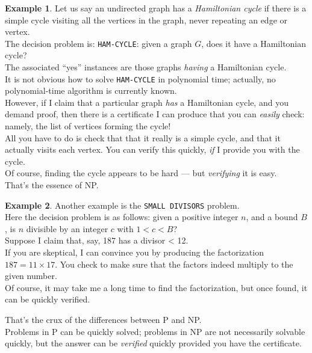 \documentclass[12pt]{article}
\theoremstyle{plain}
\theoremstyle{definition}
\newtheorem*{ex*}{Example}
\begin{document}
\begin{ex*}
Let us say an undirected graph has a \emph{Hamiltonian cycle} if there is a simple cycle visiting all the vertices in the graph, never repeating an edge or vertex. \\
The decision problem is:
\texttt{HAM-CYCLE}: given a graph $G$, does it have a Hamiltonian cycle? \\

The associated ``yes'' instances are those graphs \emph{having} a Hamiltonian cycle. \\
It is not obvious how to solve \texttt{HAM-CYCLE} in polynomial time;
actually, no polynomial-time algorithm is currently known. \\
However, if I claim that a particular graph \emph{has} a Hamiltonian cycle, and you demand proof, then there is a certificate I can produce that you can \emph{easily} check: namely, the list of vertices forming the cycle! \\
All you have to do is check that that it really is a simple cycle, and that it actually visits each vertex.
You can verify this quickly, \emph{if} I provide you with the cycle. \\
Of course, finding the cycle appears to be hard --- but \emph{verifying} it is easy. \\
That's the essence of NP.
\end{ex*}

\begin{ex*}
Another example is the \texttt{SMALL DIVISORS} problem. \\
Here the decision problem is as follows: given a positive integer $n$, and a bound $B$, is $n$ divisible by an integer $c$ with $1 < c < B$? \\

Suppose I claim that, say, 187 has a divisor < 12. \\
If you are skeptical, I can convince you by producing the factorization $187 = 11 \times 17$.
You check to make sure that the factors indeed multiply to the given number. \\
Of course, it may take me a long time to find the factorization, but once found, it can be quickly verified.
\end{ex*}

That's the crux of the differences between P and NP. \\
Problems in P can be quickly solved;
problems in NP are not necessarily solvable quickly, but the answer can be \emph{verified} quickly provided you have the certificate.
\end{document}
